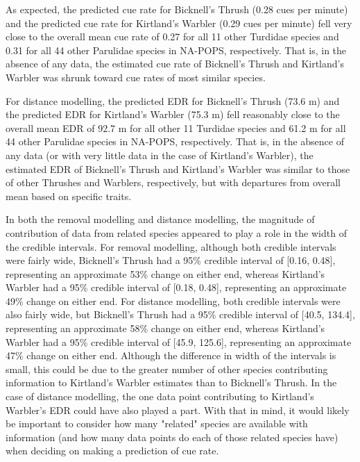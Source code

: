 \documentclass[12pt]{article}
\begin{document}
\par As expected, the predicted cue rate for Bicknell’s Thrush (0.28 cues per minute) and the predicted cue rate for Kirtland’s Warbler (0.29 cues per minute) fell very close to the overall mean cue rate of 0.27 for all 11 other Turdidae species and 0.31 for all 44 other Parulidae species in NA-POPS, respectively. 
That is, in the absence of any data, the estimated cue rate of Bicknell’s Thrush and Kirtland’s Warbler was shrunk toward cue rates of most similar species.

\par For distance modelling, the predicted EDR for Bicknell's Thrush (73.6 m) and the predicted EDR for Kirtland's Warbler (75.3 m) fell reasonably close to the overall mean EDR of 92.7 m for all other 11 Turdidae species and 61.2 m for all 44 other Parulidae species in NA-POPS, respectively.
That is, in the absence of any data (or with very little data in the case of Kirtland’s Warbler), the estimated EDR of Bicknell’s Thrush and Kirtland’s Warbler was similar to those of other Thrushes and Warblers, respectively, but with departures from overall mean based on specific traits.

\par In both the removal modelling and distance modelling, the magnitude of contribution of data from related species appeared to play a role in the width of the credible intervals. 
For removal modelling, although both credible intervals were fairly wide, Bicknell’s Thrush had a 95\% credible interval of [0.16, 0.48], representing an approximate 53\% change on either end, whereas Kirtland's Warbler had a 95\% credible interval of [0.18, 0.48], representing an approximate 49\% change on either end.
For distance modelling, both credible intervals were also fairly wide, but Bicknell's Thrush had a 95\% credible interval of [40.5, 134.4], representing an approximate 58\% change on either end, whereas Kirtland's Warbler had a 95\% credible interval of [45.9, 125.6], representing an approximate 47\% change on either end.
Although the difference in width of the intervals is small, this could be due to the greater number of other species contributing information to Kirtland's Warbler estimates than to Bicknell's Thrush.
In the case of distance modelling, the one data point contributing to Kirtland's Warbler's EDR could have also played a part.
With that in mind, it would likely be important to consider how many "related" species are available with information (and how many data points do each of those related species have) when deciding on making a prediction of cue rate.
\end{document}
